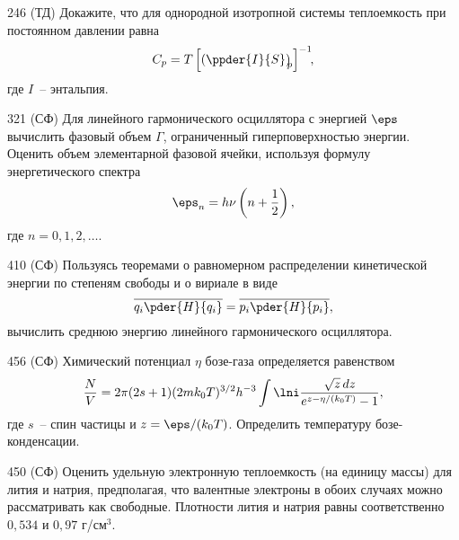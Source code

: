 \documentclass[pscyr]{hedwork}
\begin{document}
  \begin{task}{246 (ТД)}{
    Докажите, что для однородной изотропной системы теплоемкость при постоянном
    давлении равна
    \[
      C_p = T\left[\left(\ppder{I}{S}\right)_{\!\!p}\right]^{-1} \!\!,
    \]
    где \( I \)~-- энтальпия.
  }
  
  \end{task}
  
  \begin{task}{321 (СФ)}{
    Для линейного гармонического осциллятора с энергией \( \eps \) вычислить
    фазовый объем \( \Gamma \), ограниченный гиперповерхностью энергии. Оценить
    объем элементарной фазовой ячейки, используя формулу энергетического спектра
    \[
      \eps_n = h\nu \left(n + \frac{1}{2}\right),
    \]
    где \( n = 0, 1, 2, \ldots \).
  }
  
  \end{task}
  
  \begin{task}{410 (СФ)}{
    Пользуясь теоремами о равномерном распределении кинетической энергии по
    степеням свободы и о вириале в виде
    \[
      \overline{q_i\pder{H}{q_i}} = \overline{p_i\pder{H}{p_i}},
    \]
    вычислить среднюю энергию линейного гармонического осциллятора.
  }
    
  \end{task}
  
  \begin{task}{456 (СФ)}{
    Химический потенциал \( \eta \) бозе-газа определяется равенством
    \[
      \frac{N}{V} = 2\pi(2s + 1)(2mk_0 T)^{3/2} h^{-3}
        \int\lni \frac{\sqrt{z}\,dz}{e^{z - \eta / (k_0 T)} - 1},
    \]
    где \( s \)~-- спин частицы и \( z = \eps / (k_0 T) \). Определить
    температуру бозе-конденсации.
  }
  
  \end{task}
  
  \begin{task*}{450 (СФ)}{
    Оценить удельную электронную теплоемкость (на единицу массы) для лития и
    натрия, предполагая, что валентные электроны в обоих случаях можно
    рассматривать как свободные. Плотности лития и натрия равны соответственно
    \( 0,\!534 \) и \( 0,\!97 \) г/см\( ^3 \).
  }
  
  \end{task*}
\end{document}
